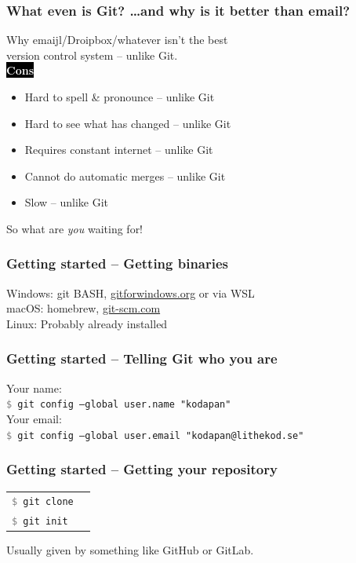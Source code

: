 \documentclass{beamer}
\newcommand{\keyword}[1]{\hspace{-1.0em}\colorbox{black}{\textcolor{white}{\textbf{#1}\vphantom{Ep}}}\vspace{0.2em}} %
\newcommand{\command}[1]{\texttt{\textcolor{gray}{\$} {#1}}}
\begin{document}
\begin{frame}[fragile]
  \frametitle{What even is Git? \dots and why is it better than email?}

  Why emaijl/Droipbox/whatever isn't the best \\
  version control system -- unlike Git.\\
  \vspace{1em}
  \keyword{Cons}
  \begin{itemize}[<+->]
    \item Hard to spell \& pronounce -- unlike Git
    \item Hard to see what has changed -- unlike Git
    \item Requires constant internet -- unlike Git
    \item Cannot do automatic merges  -- unlike Git
    \item Slow -- unlike Git
  \end{itemize}
  \vspace{1em}
  
  So what are \emph{you} waiting for!
\end{frame}

\begin{frame}[fragile]
  \frametitle{Getting started -- Getting binaries}
  
  Windows: git BASH, \url{gitforwindows.org} or via WSL\\
  macOS: homebrew, \url{git-scm.com}\\
  Linux: Probably already installed\\

\end{frame}

\begin{frame}[fragile]
  \frametitle{Getting started -- Telling Git who you are}

  Your name:\\
  \command{git config --global user.name "kodapan"} \\[1em]

  Your email:\\
  \command{git config --global user.email "kodapan@lithekod.se"} \\

\end{frame}

\begin{frame}[fragile]
  \frametitle{Getting started -- Getting your repository}
  \begin{tabular}{ll}
    \command{git clone} & \\
    \command{git init} & \\
  \end{tabular}
  \vspace{1em}
  Usually given by something like GitHub or GitLab.
\end{frame}
\end{document}
